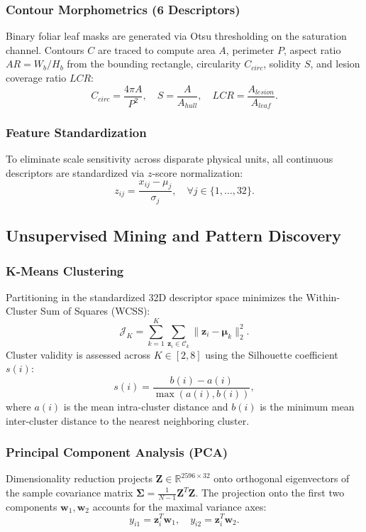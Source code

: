 \documentclass[conference]{IEEEtran}
\begin{document}
\subsubsection{Contour Morphometrics (6 Descriptors)}
Binary foliar leaf masks are generated via Otsu thresholding on the saturation channel. Contours $C$ are traced to compute area $A$, perimeter $P$, aspect ratio $AR = W_b / H_b$ from the bounding rectangle, circularity $C_{circ}$, solidity $S$, and lesion coverage ratio $LCR$:
\begin{equation}
C_{circ} = \frac{4\pi A}{P^2}, \quad S = \frac{A}{A_{hull}}, \quad LCR = \frac{A_{lesion}}{A_{leaf}}.
\end{equation}

\subsubsection{Feature Standardization}
To eliminate scale sensitivity across disparate physical units, all continuous descriptors are standardized via $z$-score normalization:
\begin{equation}
z_{ij} = \frac{x_{ij} - \mu_j}{\sigma_j}, \quad \forall j \in \{1, \dots, 32\}.
\end{equation}

\subsection{Unsupervised Mining and Pattern Discovery}

\subsubsection{K-Means Clustering}
Partitioning in the standardized 32D descriptor space minimizes the Within-Cluster Sum of Squares (WCSS):
\begin{equation}
\mathcal{J}_{K} = \sum_{k=1}^K \sum_{\mathbf{z}_i \in \mathcal{C}_k} \|\mathbf{z}_i - \boldsymbol{\mu}_k\|_2^2.
\end{equation}
Cluster validity is assessed across $K \in [2, 8]$ using the Silhouette coefficient $s(i)$:
\begin{equation}
s(i) = \frac{b(i) - a(i)}{\max\left(a(i), b(i)\right)},
\end{equation}
where $a(i)$ is the mean intra-cluster distance and $b(i)$ is the minimum mean inter-cluster distance to the nearest neighboring cluster.

\subsubsection{Principal Component Analysis (PCA)}
Dimensionality reduction projects $\mathbf{Z} \in \mathbb{R}^{2596 \times 32}$ onto orthogonal eigenvectors of the sample covariance matrix $\boldsymbol{\Sigma} = \frac{1}{N-1} \mathbf{Z}^T \mathbf{Z}$. The projection onto the first two components $\mathbf{w}_1, \mathbf{w}_2$ accounts for the maximal variance axes:
\begin{equation}
y_{i1} = \mathbf{z}_i^T \mathbf{w}_1, \quad y_{i2} = \mathbf{z}_i^T \mathbf{w}_2.
\end{equation}
\end{document}

